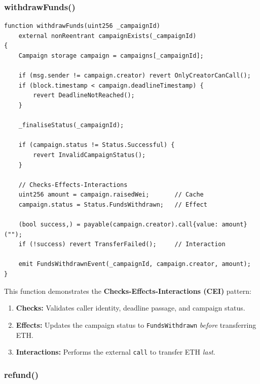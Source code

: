 \subsubsection{withdrawFunds()}

\begin{lstlisting}[language=Solidity, caption={Fund Withdrawal (CEI Pattern)}]
function withdrawFunds(uint256 _campaignId)
    external nonReentrant campaignExists(_campaignId)
{
    Campaign storage campaign = campaigns[_campaignId];

    if (msg.sender != campaign.creator) revert OnlyCreatorCanCall();
    if (block.timestamp < campaign.deadlineTimestamp) {
        revert DeadlineNotReached();
    }

    _finaliseStatus(_campaignId);

    if (campaign.status != Status.Successful) {
        revert InvalidCampaignStatus();
    }

    // Checks-Effects-Interactions
    uint256 amount = campaign.raisedWei;       // Cache
    campaign.status = Status.FundsWithdrawn;   // Effect

    (bool success,) = payable(campaign.creator).call{value: amount}("");
    if (!success) revert TransferFailed();     // Interaction

    emit FundsWithdrawnEvent(_campaignId, campaign.creator, amount);
}
\end{lstlisting}

This function demonstrates the \textbf{Checks-Effects-Interactions (CEI)} pattern:
\begin{enumerate}[leftmargin=1.5em]
    \item \textbf{Checks:} Validates caller identity, deadline passage, and campaign status.
    \item \textbf{Effects:} Updates the campaign status to \texttt{FundsWithdrawn} \emph{before} transferring ETH.
    \item \textbf{Interactions:} Performs the external \texttt{call} to transfer ETH \emph{last}.
\end{enumerate}

\subsubsection{refund()}

